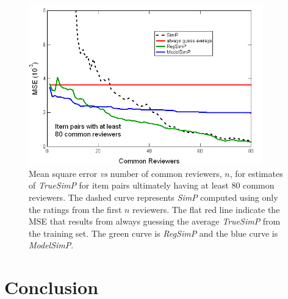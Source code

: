 \documentclass[11pt]{article}
\begin{document}
\begin{figure}[!htbp]
    \centering
    \includegraphics[width=0.9\textwidth]{MSE_SimP_80.png}
	\caption{Mean square error {\em vs} number of common reviewers, $n$, for
estimates of {\em TrueSimP} for item pairs ultimately having at least 80 common
reviewers. The dashed curve represents
{\em SimP} computed using only the ratings from the first $n$ reviewers. The
flat red line indicate the MSE that results from always guessing the average
{\em TrueSimP} from the training set. The green curve is {\em RegSimP} and the
blue curve is {\em ModelSimP}. }
    \label{fig:MSE_SimP}
\end{figure}

\section*{Conclusion}
\end{document}
